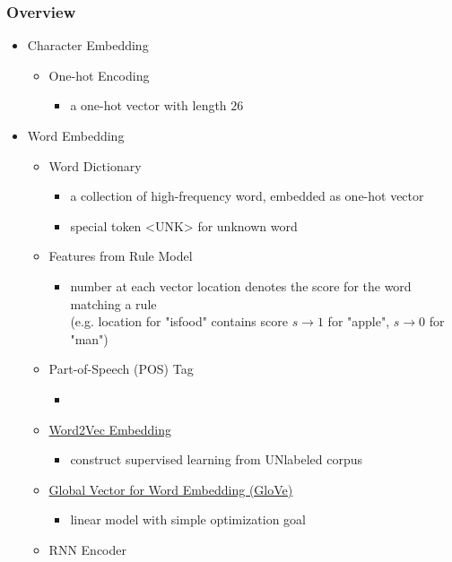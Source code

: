 \subsubsection{Overview}
\begin{itemize}
\item Character Embedding
	\begin{itemize}
	\item One-hot Encoding
		\begin{itemize}
		\item a one-hot vector with length $26$
		\end{itemize}
	\end{itemize}
\item Word Embedding
	\begin{itemize}
	\item Word Dictionary
		\begin{itemize}
		\item a collection of high-frequency word, embedded as one-hot vector
		\item special token \textless{}UNK\textgreater{} for unknown word
		\end{itemize}
	\item Features from Rule Model
		\begin{itemize}
		\item number at each vector location denotes the score for the word matching a rule \\
		(e.g. location for "is\textunderscore{}food" contains score $s\rightarrow1$ for "apple", $s\rightarrow0$ for "man")
		\end{itemize}
	\item Part-of-Speech (POS) Tag
		\begin{itemize}
		\item 
		\end{itemize}
	\item \hyperref[DL_NLP_Langrep_word2vec]{Word2Vec Embedding}
		\begin{itemize}
		\item construct supervised learning from UNlabeled corpus
		\end{itemize}
	\item \hyperref[DL_NLP_Langrep_GloVe]{Global Vector for Word Embedding (GloVe)}
		\begin{itemize}
		\item linear model with simple optimization goal
		\end{itemize}
	\item RNN Encoder

\end{itemize}
\end{itemize}
